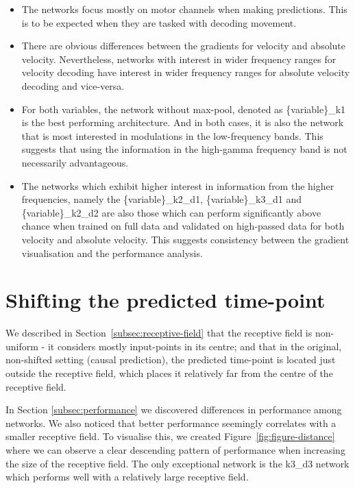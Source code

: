 \begin{itemize}
    \item The networks focus mostly on motor channels when making predictions.
This is to be expected when they are tasked with decoding movement.
    \item There are obvious differences between the gradients for velocity and absolute velocity.
    Nevertheless, networks with interest in wider frequency ranges for velocity decoding have interest in wider frequency ranges for absolute velocity decoding and vice-versa.
    \item For both variables, the network without max-pool, denoted as \{variable\}\_k1 is the best performing architecture.
    And in both cases, it is also the network that is most interested in modulations in the low-frequency bands.
    This suggests that using the information in the high-gamma frequency band is not necessarily advantageous.
    \item The networks which exhibit higher interest in information from the higher frequencies, namely the \{variable\}\_k2\_d1, \{variable\}\_k3\_d1 and \{variable\}\_k2\_d2 are also those which can perform significantly above chance when trained on full data and validated on high-passed data for both velocity and absolute velocity.
    This suggests consistency between the gradient visualisation and the performance analysis.

\end{itemize}

\clearpage
\section{Shifting the predicted time-point}\label{sec:shifting-the-predicted-time-point}
We described in Section~\ref{subsec:receptive-field} that the receptive field is non-uniform - it considers mostly input-points in its centre; and that in the original, non-shifted setting (causal prediction), the predicted time-point is located just outside the receptive field, which places it relatively far from the centre of the receptive field. 

In Section \ref{subsec:performance} we discovered differences in performance among networks. We also noticed that better performance seemingly correlates with a smaller receptive field. To visualise this, we created Figure~\ref{fig:figure-distance} where we can observe a clear descending pattern of performance when increasing the size of the receptive field. The only exceptional network is the k3\_d3 network which performs well with a relatively large receptive field. 

